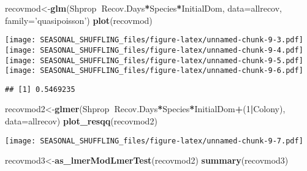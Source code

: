 \documentclass[]{article}
\newenvironment{Shaded}{\begin{snugshade}}{\end{snugshade}}
\newcommand{\CommentTok}[1]{\textcolor[rgb]{0.56,0.35,0.01}{\textit{#1}}}
\newcommand{\DataTypeTok}[1]{\textcolor[rgb]{0.13,0.29,0.53}{#1}}
\newcommand{\DecValTok}[1]{\textcolor[rgb]{0.00,0.00,0.81}{#1}}
\newcommand{\KeywordTok}[1]{\textcolor[rgb]{0.13,0.29,0.53}{\textbf{#1}}}
\newcommand{\NormalTok}[1]{#1}
\newcommand{\OperatorTok}[1]{\textcolor[rgb]{0.81,0.36,0.00}{\textbf{#1}}}
\newcommand{\StringTok}[1]{\textcolor[rgb]{0.31,0.60,0.02}{#1}}
\begin{document}
\begin{Shaded}
\begin{Highlighting}[]
\NormalTok{recovmod<-}\KeywordTok{glm}\NormalTok{(Shprop}\OperatorTok{~}\NormalTok{Recov.Days}\OperatorTok{*}\NormalTok{Species}\OperatorTok{*}\NormalTok{InitialDom, }\DataTypeTok{data=}\NormalTok{allrecov, }\DataTypeTok{family=}\StringTok{'quasipoisson'}\NormalTok{)}
\KeywordTok{plot}\NormalTok{(recovmod)}
\end{Highlighting}
\end{Shaded}

\texttt{[image: SEASONAL\_SHUFFLING\_files/figure-latex/unnamed-chunk-9-3.pdf]}
\texttt{[image: SEASONAL\_SHUFFLING\_files/figure-latex/unnamed-chunk-9-4.pdf]}
\texttt{[image: SEASONAL\_SHUFFLING\_files/figure-latex/unnamed-chunk-9-5.pdf]}
\texttt{[image: SEASONAL\_SHUFFLING\_files/figure-latex/unnamed-chunk-9-6.pdf]}

\begin{Shaded}
\end{Shaded}

\begin{verbatim}
## [1] 0.5469235
\end{verbatim}

\begin{Shaded}
\begin{Highlighting}[]
\NormalTok{recovmod2<-}\KeywordTok{glmer}\NormalTok{(Shprop}\OperatorTok{~}\NormalTok{Recov.Days}\OperatorTok{*}\NormalTok{Species}\OperatorTok{*}\NormalTok{InitialDom}\OperatorTok{+}\NormalTok{(}\DecValTok{1}\OperatorTok{|}\NormalTok{Colony), }\DataTypeTok{data=}\NormalTok{allrecov)}
\KeywordTok{plot_resqq}\NormalTok{(recovmod2)}
\end{Highlighting}
\end{Shaded}

\texttt{[image: SEASONAL\_SHUFFLING\_files/figure-latex/unnamed-chunk-9-7.pdf]}

\begin{Shaded}
\begin{Highlighting}[]
\NormalTok{recovmod3<-}\KeywordTok{as_lmerModLmerTest}\NormalTok{(recovmod2)}
\KeywordTok{summary}\NormalTok{(recovmod3)}
\end{Highlighting}
\end{Shaded}
\end{document}

